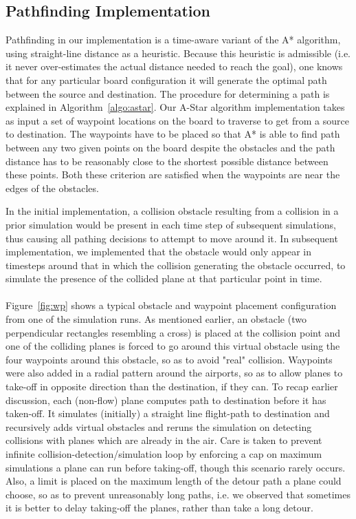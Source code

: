 \documentclass[10pt]{article}
\begin{document}
\subsection{Pathfinding Implementation}
Pathfinding in our implementation is a time-aware variant of the A* algorithm,
using straight-line distance as a heuristic. Because this heuristic is
admissible (i.e. it never over-estimates the actual distance needed to reach the
goal), one knows that for any particular board configuration it will generate
the optimal path between the source and destination. The procedure for
determining a path is explained in Algorithm~\ref{algo:astar}. Our A-Star
algorithm implementation takes as input a set of waypoint locations on the board
to traverse to get from a source to destination.  The waypoints have to be
placed so that A* is able to find path between any two given points on the board
despite the obstacles and the path distance has to be reasonably close to the
shortest possible distance between these points.  Both these criterion are
satisfied when the waypoints are near the edges of the obstacles. 

In the initial implementation, a collision obstacle resulting from a collision
in a prior simulation would be present in each time step of subsequent
simulations, thus causing all pathing decisions to attempt to move around it. In
subsequent implementation, we implemented that the obstacle would only appear in
timesteps around that in which the collision generating the obstacle occurred,
to simulate the presence of the collided plane at that particular point in
time.\\\\

Figure~\ref{fig:wp} shows a typical obstacle and waypoint placement
configuration from one of the simulation runs. As mentioned earlier, an obstacle
(two perpendicular rectangles resembling a cross) is placed at the collision
point and one of the colliding planes is forced to go around this virtual
obstacle using the four waypoints around this obstacle, so as to avoid "real"
collision. Waypoints were also added in a radial pattern around the airports, so
as to allow planes to take-off in opposite direction than the destination, if
they can. To recap earlier discussion, each (non-flow) plane computes path to
destination before it has taken-off. It simulates (initially) a straight line
flight-path to destination and recursively adds virtual obstacles and reruns the
simulation on detecting collisions with planes which are already in the air.
Care is taken to prevent infinite collision-detection/simulation loop by
enforcing a cap on maximum simulations a plane can run before taking-off, though
this scenario rarely occurs. Also, a limit is placed on the maximum length of
the detour path a plane could choose, so as to prevent unreasonably long paths,
i.e. we observed that sometimes it is better to delay taking-off the planes,
rather than take a long detour.
\end{document}
